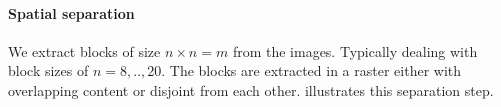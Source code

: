 \paragraph{Spatial separation}
We extract blocks of size $n \times n=m$ from the images. Typically dealing with
block sizes of $n=8,..,20$. The blocks are extracted in a raster either with
overlapping content or disjoint from each other. 
illustrates this separation step. 
\begin{figure}[h]
\centering
{}
\hspace{5mm}
\subfloat[]{\includegraphics[scale =
}
\end{figure}
